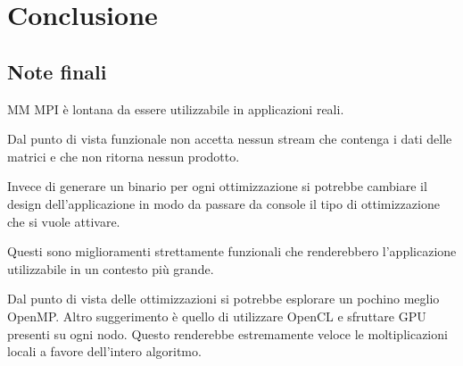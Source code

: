 \chapter{Conclusione}
\section{Note finali}

MM MPI \`{e} lontana da essere utilizzabile in applicazioni reali.

Dal punto di vista funzionale non accetta nessun stream che contenga i dati delle matrici e che non ritorna nessun prodotto.

Invece di generare un binario per ogni ottimizzazione si potrebbe cambiare il design dell'applicazione in modo da passare da console il tipo di ottimizzazione che si vuole attivare.

Questi sono miglioramenti strettamente funzionali che renderebbero l'applicazione utilizzabile in un contesto pi\`{u} grande.

Dal punto di vista delle ottimizzazioni si potrebbe esplorare un pochino meglio OpenMP. Altro suggerimento \`{e} quello di utilizzare OpenCL e sfruttare GPU presenti su ogni nodo. Questo renderebbe estremamente veloce le moltiplicazioni locali a favore dell'intero algoritmo.
